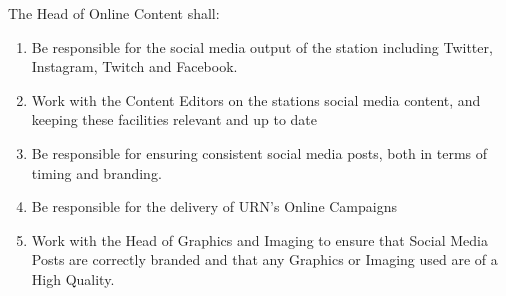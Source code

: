 \item The Head of Online Content shall:
\begin{enumerate}[label*=\arabic*.]
    \item Be responsible for the social media output of the station including Twitter, Instagram, Twitch and Facebook.
    \item Work with the Content Editors on the stations social media content, and keeping these facilities relevant and up to date
    \item Be responsible for ensuring consistent social media posts, both in terms of timing and branding.
    \item Be responsible for the delivery of URN's Online Campaigns
    \item Work with the Head of Graphics and Imaging to ensure that Social Media Posts are correctly branded and that any Graphics or Imaging used are of a High Quality.
\end{enumerate}
